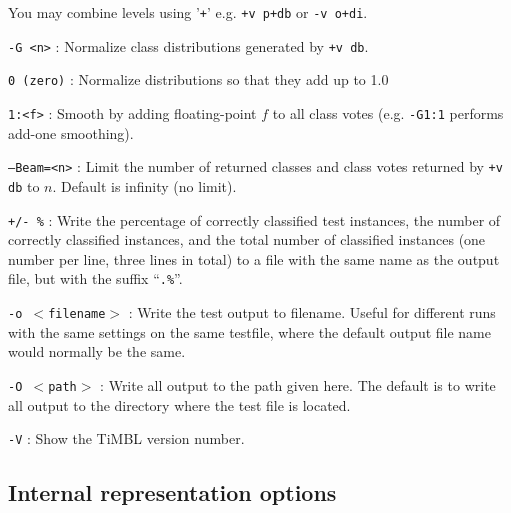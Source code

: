 \documentclass{book}
\begin{document}
\begin{description}
        You may combine levels using '{\tt +}' e.g. {\tt +v p+db} or
        {\tt -v o+di}.

\item {\tt -G <n>} : Normalize class distributions generated by {\tt +v db}.
  \begin{description}
    \item {\tt 0 (zero)} : Normalize distributions so that they add up to 1.0
    \item {\tt 1:<f>} : Smooth by adding floating-point $f$ to all class votes (e.g. {\tt -G1:1} performs add-one smoothing).
  \end{description}

\item {\tt --Beam=<n>} : Limit the number of returned classes and class
  votes returned by {\tt +v db} to $n$. Default is infinity (no limit).

\item {\tt +/- \%} : Write the percentage of correctly classified test
  instances, the number of correctly classified instances, and the
  total number of classified instances (one number per line, three
  lines in total) to a file with the same name as the output file, but
  with the suffix ``{\tt .\%}''.

\item {\tt -o $<$filename$>$} : Write the test output to filename. Useful
  for different runs with the same settings on the same testfile,
  where the default output file name would normally be the same.

\item {\tt -O $<$path$>$} : Write all output to the path given here. The
  default is to write all output to the directory where the test file
  is located.

\item {\tt -V} : Show the TiMBL version number.

\end{description}

\subsection{Internal representation options}
\end{document}
